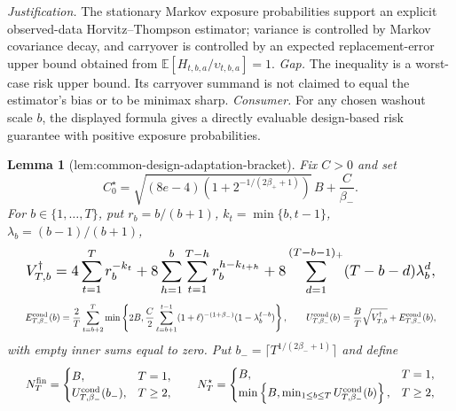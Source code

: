 \documentclass{article}
\newtheorem{lemma}{Lemma}
\begin{document}
\par\smallskip\noindent \textit{Justification.} The stationary Markov exposure probabilities support an explicit observed-data Horvitz--Thompson estimator; variance is controlled by Markov covariance decay, and carryover is controlled by an expected replacement-error upper bound obtained from \(\mathbb E[H_{t,b,a}/\upsilon_{t,b,a}]=1\). \textit{Gap.} The inequality is a worst-case risk upper bound. Its carryover summand is not claimed to equal the estimator's bias or to be minimax sharp. \textit{Consumer.} For any chosen washout scale \(b\), the displayed formula gives a directly evaluable design-based risk guarantee with positive exposure probabilities.

\begin{lemma}[lem:common-design-adaptation-bracket]\label{lem:common-design-adaptation-bracket}
Fix \(C>0\) and set \[C_0^\star=\sqrt{(8e-4)\left(1+2^{-1/(2\beta_++1)}\right)}\,B+\frac C{\beta_-}.\] For \(b\in\{1,\ldots,T\}\), put \(r_b=b/(b+1)\), \(k_t=\min\{b,t-1\}\), \(\lambda_b=(b-1)/(b+1)\), \[
\makebox[\linewidth][c]{\resizebox{0.98\linewidth}{!}{\leavevmode\par\noindent \makebox[\linewidth][c]{\resizebox{0.98\linewidth}{!}{\(\displaystyle \displaystyle V_{T,b}^{\dagger}=4\sum_{t=1}^T r_b^{-k_t}+8\sum_{h=1}^b\sum_{t=1}^{T-h}r_b^{h-k_{t+h}}+8\sum_{d=1}^{(T-b-1)_+}(T-b-d)\lambda_b^d,\)}}\par\noindent}}
\] \[
\makebox[\linewidth][c]{\resizebox{0.98\linewidth}{!}{\leavevmode\par\noindent \makebox[\linewidth][c]{\resizebox{0.98\linewidth}{!}{\(\displaystyle \displaystyle E_{T,\beta_-}^{\mathrm{cond}}(b)=\frac2T\sum_{t=b+2}^T\min\left\{2B,\frac C2\sum_{\ell=b+1}^{t-1}(1+\ell)^{-(1+\beta_-)}(1-\lambda_b^{\ell-b})\right\},\qquad U_{T,\beta_-}^{\mathrm{cond}}(b)=\frac BT\sqrt{V_{T,b}^{\dagger}}+E_{T,\beta_-}^{\mathrm{cond}}(b),\)}}\par\noindent}}
\] with empty inner sums equal to zero. Put \(b_-=\lceil T^{1/(2\beta_-+1)}\rceil\) and define \[
\makebox[\linewidth][c]{\resizebox{0.98\linewidth}{!}{\leavevmode\par\noindent \makebox[\linewidth][c]{\resizebox{0.98\linewidth}{!}{\(\displaystyle \displaystyle N_T^{\mathrm{fin}}=\begin{cases}B,&T=1,\\ U_{T,\beta_-}^{\mathrm{cond}}(b_-),&T\ge2,\end{cases}\qquad N_T^\star=\begin{cases}B,&T=1,\\ \min\left\{B,\min_{1\le b\le T}U_{T,\beta_-}^{\mathrm{cond}}(b)\right\},&T\ge2,\end{cases}\)}}\par\noindent}}
\]
\end{lemma}
\end{document}
